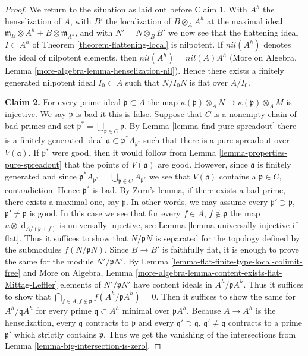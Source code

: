 \documentclass{amsart}
\theoremstyle{plain}
\theoremstyle{definition}
\theoremstyle{remark}
\numberwithin{equation}{subsection}
\begin{document}
\begin{proof}
\medskip\noindent
We return to the situation as laid out before Claim 1. With
$A^h$ the henselization of $A$, with $B'$ the localization
of $B \otimes_A A^h$ at the maximal ideal
$\mathfrak m_B \otimes A^h + B \otimes \mathfrak m_{A^h}$, and with
$N' = N \otimes_B B'$ we now see that the flattening ideal $I \subset A^h$
of Theorem \ref{theorem-flattening-local} is nilpotent.
If $nil(A^h)$ denotes the ideal of nilpotent elements, then
$nil(A^h) = nil(A) A^h$
(More on Algebra, Lemma \ref{more-algebra-lemma-henselization-nil}).
Hence there exists a finitely generated
nilpotent ideal $I_0 \subset A$ such that $N/I_0N$ is flat over $A/I_0$.

\medskip\noindent
{\bf Claim 2.} For every prime ideal $\mathfrak p \subset A$
the map
$\kappa(\mathfrak p) \otimes_A N \to \kappa(\mathfrak p) \otimes_A M$
is injective. We say $\mathfrak p$ is bad it this is false.
Suppose that $C$ is a nonempty chain of bad primes and set
$\mathfrak p^* = \bigcup_{\mathfrak p \in C} \mathfrak p$.
By Lemma \ref{lemma-find-pure-spreadout}
there is a finitely generated ideal
$\mathfrak a \subset \mathfrak p^*A_{\mathfrak p^*}$
such that there is a pure spreadout over $V(\mathfrak a)$.
If $\mathfrak p^*$ were good, then it would follow from
Lemma \ref{lemma-properties-pure-spreadout}
that the points of $V(\mathfrak a)$ are good.
However, since $\mathfrak a$ is finitely generated and since
$\mathfrak p^*A_{\mathfrak p^*} = \bigcup_{\mathfrak p \in C}A_{\mathfrak p^*}$
we see that $V(\mathfrak a)$ contains a $\mathfrak p \in C$, contradiction.
Hence $\mathfrak p^*$ is bad. By Zorn's lemma, if there exists a
bad prime, there exists a maximal one, say $\mathfrak p$.
In other words, we may assume every $\mathfrak p' \supset \mathfrak p$,
$\mathfrak p' \not = \mathfrak p$ is good.
In this case we see that for every $f \in A$, $f \not \in \mathfrak p$
the map $u \otimes \text{id}_{A/(\mathfrak p + f)}$ is universally
injective, see Lemma \ref{lemma-universally-injective-if-flat}.
Thus it suffices to show that $N/\mathfrak p N$ is separated
for the topology defined by the submodules $f(N/\mathfrak pN)$.
Since $B \to B'$ is faithfully flat, it is enough to prove the
same for the module $N'/\mathfrak p N'$.
By Lemma \ref{lemma-flat-finite-type-local-colimit-free} and
More on Algebra, Lemma
\ref{more-algebra-lemma-content-exists-flat-Mittag-Leffler}
elements of $N'/\mathfrak pN'$ have content ideals in $A^h/\mathfrak pA^h$.
Thus it suffices to show that
$\bigcap_{f \in A, f \not \in \mathfrak p} f(A^h/\mathfrak p A^h) = 0$.
Then it suffices to show the same for
$A^h/\mathfrak q A^h$ for every prime $\mathfrak q \subset A^h$
minimal over $\mathfrak p A^h$. Because $A \to A^h$ is the henselization,
every $\mathfrak q$ contracts to $\mathfrak p$ and every
$\mathfrak q' \supset \mathfrak q$, $\mathfrak q' \not = \mathfrak q$
contracts to a prime $\mathfrak p'$ which strictly contains $\mathfrak p$.
Thus we get the vanishing of the intersections from
Lemma \ref{lemma-big-intersection-is-zero}.


\end{proof}
\end{document}
